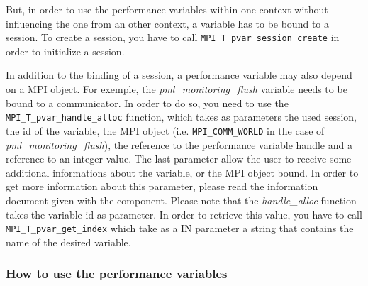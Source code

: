 \documentclass[notitlepage]{article}
\begin{document}
But, in order to use the performance variables within one context
without influencing the one from an other context, a variable has to
be bound to a session. To create a session, you have to call
\texttt{MPI\_T\_pvar\_session\_create} in order to initialize a session.

In addition to the binding of a session, a performance variable may
also depend on a MPI object. For exemple, the
\textit{pml\_monitoring\_flush} variable needs to be bound to a
communicator. In order to do so, you need to use the
\texttt{MPI\_T\_pvar\_handle\_alloc} function, which takes as
parameters the used session, the id of the variable, the MPI object
(i.e. \texttt{MPI\_COMM\_WORLD} in the case of
\textit{pml\_monitoring\_flush}), the reference to the performance
variable handle and a reference to an integer value. The last
parameter allow the user to receive some additional informations
about the variable, or the MPI object bound. In order to get more
information about this parameter, please read the information document
given with the component. Please note that the \textit{handle\_alloc}
function takes the variable id as parameter. In order to retrieve this
value, you have to call \texttt{MPI\_T\_pvar\_get\_index} which take as
a IN parameter a string that contains the name of the desired
variable.

\subsubsection{How to use the performance variables}
\end{document}
